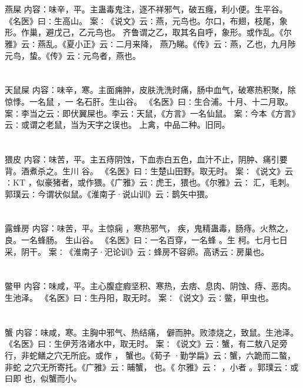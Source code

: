 \documentclass[12pt,UTF8]{ctexbook}
\begin{document}
\section{}燕屎
内容：味辛，平。主蛊毒鬼注，逐不祥邪气，破五癃，利小便。生平谷。 
《名医》曰∶生高山。 
案∶《说文》云∶燕，元鸟也。尔口，布翅，枝尾，象形。作巢，避戊己，乙元鸟也。 
齐鲁谓之乙，取其名自呼，象形。或作乱。《尔雅》云∶燕乱。《夏小正》云∶二月来降， 
燕乃睇。《传》云∶燕，乙也，九月陟元鸟，蛰。《传》云∶元鸟者，燕也。 


\section{}天鼠屎
内容：味辛，寒。主面痈肿，皮肤洗洗时痛，肠中血气，破寒热积聚，除惊悸。一名鼠 ，一 
名石肝。生山谷。 
《名医》曰∶生合浦。十月、十二月取。 
案∶李当之云∶即伏翼屎也。李云∶天鼠，《方言》一名仙鼠。 
案∶今本《方言》云∶或谓之老鼠，当为天字之误也。 
上禽，中品二种。旧同。 


\section{}猥皮
内容：味苦，平。主五痔阴蚀，下血赤白五色，血汁不止，阴肿、痛引要背。酒煮杀之。生川 
谷。 
《名医》曰∶生楚山田野。取无时。 
案∶《说文》云∶KT ，似豪猪者，或作猥。《广雅》云∶虎王，猥也。《尔雅》云∶ 
汇，毛刺。郭璞云∶今谓状似鼠。《淮南子·说山训》云∶鹊矢中猥。 


\section{}露蜂房
内容：味苦，平。主惊痫 ，寒热邪气， 疾，鬼精蛊毒，肠痔。火熬之，良。一名蜂肠。 
生山谷。 
《名医》曰∶一名百穿，一名蜂 。生 柯。七月七日采，阴干。 
案∶《淮南子·汜论训》云∶蜂房不容卵。高诱云∶房巢也。 


\section{}鳖甲
内容：味咸，平。主心腹症瘕坚积、寒热，去痞、息肉、阴蚀、痔、恶肉。生池泽。 
《名医》曰∶生丹阳，取无时。 
案∶《说文》云∶鳖，甲虫也。 


\section{}蟹
内容：味咸，寒。主胸中邪气、热结痛， 僻而肿。败漆烧之，致鼠。生池泽。 
《名医》曰∶生伊芳洛诸水中，取无时。 
案∶《说文》云∶蟹，有二敖八足旁行，非蛇鳝之穴无所庇。或作 ， 蟹也。《荀子 
·勤学扁》云∶蟹，六跪而二螯，非蛇 之穴无所寄托。《广雅》云∶晡蟹， 也。《 
尔雅》云∶ ，小者 。郭璞云∶或曰即 也，似蟹而小。 
\end{document}
